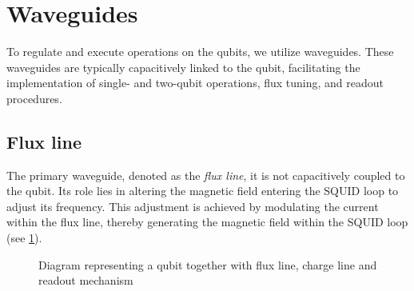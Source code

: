 \section{Waveguides}
\label{sec_waveguides}

To regulate and execute operations on the qubits, we utilize waveguides.
These waveguides are typically capacitively linked to the qubit, facilitating the implementation of single- and two-qubit operations, flux tuning, and readout procedures.

\subsection{Flux line}

The primary waveguide, denoted as the \emph{flux line}, it is not capacitively coupled to the qubit.
Its role lies in altering the magnetic field entering the SQUID loop to adjust its frequency.
This adjustment is achieved by modulating the current within the flux line, thereby generating the magnetic field within the SQUID loop (see \cref{fig:diagram_storage_qubit}).

\begin{figure}
    \centering
    
    \vspace{-1cm}
    \caption{Diagram representing a qubit together with flux line, charge line and readout mechanism}
    \label{fig:diagram_storage_qubit}
\end{figure}

%        

